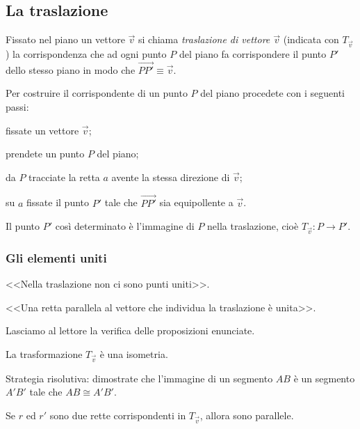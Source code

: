 \subsection{La traslazione}

\begin{definizione}
Fissato nel piano un vettore $\vec{v}$ si chiama \emph{traslazione di vettore $\vec{v}$} (indicata con $T_{\vec{v}}$) la corrispondenza che ad ogni punto $P$ del piano fa corrispondere il punto $P'$ dello stesso piano in modo che $\vec{PP'}\equiv\vec{v}$.
\end{definizione}

Per costruire il corrispondente di un punto $P$ del piano procedete con i seguenti passi:
\begin{enumerate*}
\item fissate un vettore $\vec{v}$;
\item prendete un punto $P$ del piano;
\item da $P$ tracciate la retta $a$ avente la stessa direzione di $\vec{v}$;
\item su $a$ fissate il punto $P'$ tale che $\vec{PP'}$ sia equipollente a $\vec{v}$.
\end{enumerate*}
Il punto $P'$ così determinato è l'immagine di $P$ nella traslazione, cioè $T_{\vec{v}}:P\rightarrow P'$.

\subsubsection{Gli elementi uniti}

\begin{itemize*}
\item <<Nella traslazione non ci sono punti uniti>>.
\item <<Una retta parallela al vettore che individua la traslazione è unita>>.
\end{itemize*}

Lasciamo al lettore la verifica delle proposizioni enunciate.

\begin{teorema}
La trasformazione $T_{\vec{v}}$ è una isometria.
\end{teorema}

Strategia risolutiva: dimostrate che l'immagine di un segmento $AB$ è un segmento $A'B'$ tale che $AB\cong A'B'$.

\begin{teorema}
Se $r$ ed $r'$ sono due rette corrispondenti in $T_{\vec{v}}$, allora sono parallele.
\end{teorema}

